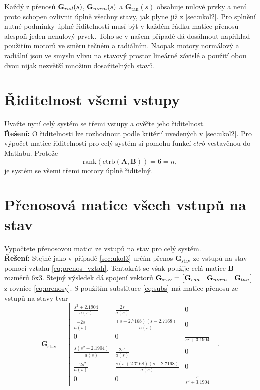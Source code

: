 \documentclass[twoside]{article}
\begin{document}
Každý z přenosů $\mathbf{G}_{rad}(s)$, $\mathbf{G}_{norm}(s)$ a $\mathbf{G}_\tan(s)$ obsahuje nulové prvky a není proto schopen ovlivnit 
úplně všechny stavy, jak plyne již z \ref{sec:ukol2}. Pro splnění nutné podmínky úplné řiditelnosti musí být v 
každém řádku matice přenosů alespoň jeden nenulový prvek. Toho se v našem případě dá dosáhnout
například použitím motorů ve směru tečném a radiálním. Naopak motory normálový a radiální jsou ve smyslu vlivu na
stavový prostor lineárně závislé a použití obou dvou nijak nezvětší množinu dosažitelných stavů.

\section{Řiditelnost všemi vstupy}
\label{sec:ukol4}
Uvažte nyní celý systém se třemi vstupy a ověřte jeho řiditelnost. \\
\textbf{Řešení:}
O řiditelnosti lze rozhodnout podle kritérií uvedených v \ref{sec:ukol2}.
Pro výpočet  matice řiditelnosti pro celý systém si pomohu funkcí $ctrb$ vestavěnou do Matlabu. Protože
\begin{equation*}
	\text{rank}(\text{ctrb}(\mathbf{A}, \mathbf{B})) = 6 = n,
\end{equation*}
je systém se všemi třemi motory úplně řiditelný.

\section{Přenosová matice všech vstupů na stav}
\label{sec:ukol5}
Vypočtete přenosovou matici ze vstupů na stav pro celý systém.\\
\textbf{Řešení:}
Stejně jako v případě \ref{sec:ukol3} určím přenos $\mathbf{G}_{\text{stav}}$ ze vstupů na stav pomocí vztahu \eqref{eq:prenos_vztah}.
Tentokrát se však použije celá matice $\mathbf{B}$ rozměrů 6x3. Stejný výsledek dá spojení vektorů $\mathbf{G}_{\text{stav}} = 
\begin{bmatrix} \mathbf{G}_{rad} & \mathbf{G}_{norm} & \mathbf{G}_{tan} \end{bmatrix}$ z rovnice \eqref{eq:prenosy}.
S použitím substituce \eqref{eq:subs} má matice přenosu ze vstupů na stavy tvar
\begin{equation*}
	\mathbf{G}_\text{stav} = \begin{bmatrix}
	\frac{s^2+2.1904     }{a(s)} 	&\frac{2s}{a(s)}                     & 0                             \\
	\frac{-2s        }{a(s)}        	&\frac{(s+2.7168)(s-2.7168) }{a(s)} & 0                             \\
	0                                    	&0                                        & \frac{}{s^2+3.1904}     \\
	\frac{s(s^2+2.1904)}{a(s)}     	&\frac{2s^2                  }{a(s)} & 0                             \\
	\frac{-2s^2}{a(s)}              	&\frac{s(s+2.7168)(s-2.7168)}{a(s)} & 0                             \\
	0                                    	&0                                        & \frac{s}{s^2+3.1904}    
	\end{bmatrix}.
\end{equation*}
\end{document}
